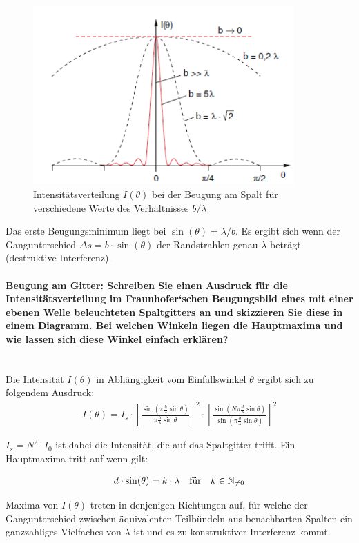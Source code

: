 \documentclass[a4paper, 11pt, ngerman, parskip=half-]{scrartcl}
\newcommand{\myparagraph}[1]{\paragraph{#1}\mbox{}\\}
\begin{document}
\begin{figure}[H]
    \centering
    \includegraphics[width=10cm]{image/19/2.3}
    \caption{Intensitätsverteilung $I(\theta)$ bei der Beugung am Spalt für verschiedene Werte des Verhältnisses $b/\lambda$}
\end{figure}

Das erste Beugungsminimum liegt bei $\sin(\theta) = \lambda / b$. Es ergibt sich wenn der Gangunterschied $\Delta s = b \cdot \sin(\theta)$ der Randstrahlen genau $\lambda$ beträgt (destruktive Interferenz).

\myparagraph{Beugung am Gitter: Schreiben Sie einen Ausdruck für die Intensitätsverteilung im
    Fraunhofer‘schen Beugungsbild eines mit einer ebenen Welle beleuchteten Spaltgitters an
    und skizzieren Sie diese in einem Diagramm. Bei welchen Winkeln liegen die Hauptmaxima
    und wie lassen sich diese Winkel einfach erklären?}

Die Intensität $I(\theta)$ in Abhängigkeit vom Einfallswinkel $\theta$ ergibt sich zu folgendem Ausdruck:
\begin{align*}
    I(\theta) = I_s \cdot \left[ \frac{\sin(\pi \frac{b}{\lambda} \sin \theta)}{\pi \frac{b}{\lambda} \sin \theta} \right]^2 \cdot \left[ \frac{\sin(N \pi \frac{d}{\lambda} \sin \theta)}{\sin(\pi \frac{d}{\lambda} \sin \theta)} \right]^2
\end{align*}

$I_s = N^2 \cdot I_0$ ist dabei die Intensität, die auf das Spaltgitter trifft. Ein Hauptmaxima tritt auf wenn gilt:

\begin{align*}
    d \cdot \sin(\theta) = k \cdot \lambda \qq{für} k \in \mathbb N_{\ne 0}
\end{align*}

Maxima von $I(\theta)$ treten in denjenigen Richtungen auf, für welche der Gangunterschied zwischen äquivalenten Teilbündeln aus benachbarten Spalten ein ganzzahliges Vielfaches von $\lambda$ ist und es zu konstruktiver Interferenz kommt.
\end{document}

